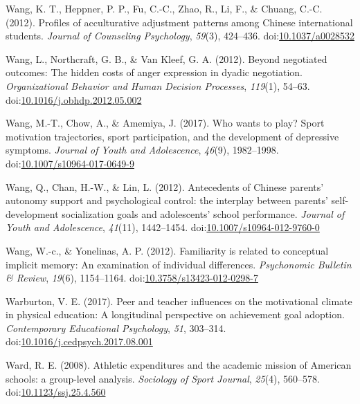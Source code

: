 \documentclass[english,man]{apa6}
\theoremstyle{definition}
\theoremstyle{definition}
\theoremstyle{definition}
\theoremstyle{remark}
\begin{document}
\hypertarget{ref-Wang2012a}{}
Wang, K. T., Heppner, P. P., Fu, C.-C., Zhao, R., Li, F., \& Chuang,
C.-C. (2012). Profiles of acculturative adjustment patterns among
Chinese international students. \emph{Journal of Counseling Psychology},
\emph{59}(3), 424--436.
doi:\href{https://doi.org/10.1037/a0028532}{10.1037/a0028532}

\hypertarget{ref-Wang2012b}{}
Wang, L., Northcraft, G. B., \& Van Kleef, G. A. (2012). Beyond
negotiated outcomes: The hidden costs of anger expression in dyadic
negotiation. \emph{Organizational Behavior and Human Decision
Processes}, \emph{119}(1), 54--63.
doi:\href{https://doi.org/10.1016/j.obhdp.2012.05.002}{10.1016/j.obhdp.2012.05.002}

\hypertarget{ref-Wang2017}{}
Wang, M.-T., Chow, A., \& Amemiya, J. (2017). Who wants to play? Sport
motivation trajectories, sport participation, and the development of
depressive symptoms. \emph{Journal of Youth and Adolescence},
\emph{46}(9), 1982--1998.
doi:\href{https://doi.org/10.1007/s10964-017-0649-9}{10.1007/s10964-017-0649-9}

\hypertarget{ref-Wang2012}{}
Wang, Q., Chan, H.-W., \& Lin, L. (2012). Antecedents of Chinese
parents' autonomy support and psychological control: the interplay
between parents' self-development socialization goals and adolescents'
school performance. \emph{Journal of Youth and Adolescence},
\emph{41}(11), 1442--1454.
doi:\href{https://doi.org/10.1007/s10964-012-9760-0}{10.1007/s10964-012-9760-0}

\hypertarget{ref-Wang2012c}{}
Wang, W.-c., \& Yonelinas, A. P. (2012). Familiarity is related to
conceptual implicit memory: An examination of individual differences.
\emph{Psychonomic Bulletin \& Review}, \emph{19}(6), 1154--1164.
doi:\href{https://doi.org/10.3758/s13423-012-0298-7}{10.3758/s13423-012-0298-7}

\hypertarget{ref-Warburton2017}{}
Warburton, V. E. (2017). Peer and teacher influences on the motivational
climate in physical education: A longitudinal perspective on achievement
goal adoption. \emph{Contemporary Educational Psychology}, \emph{51},
303--314.
doi:\href{https://doi.org/10.1016/j.cedpsych.2017.08.001}{10.1016/j.cedpsych.2017.08.001}

\hypertarget{ref-Ward2008}{}
Ward, R. E. (2008). Athletic expenditures and the academic mission of
American schools: a group-level analysis. \emph{Sociology of Sport
Journal}, \emph{25}(4), 560--578.
doi:\href{https://doi.org/10.1123/ssj.25.4.560}{10.1123/ssj.25.4.560}
\end{document}
